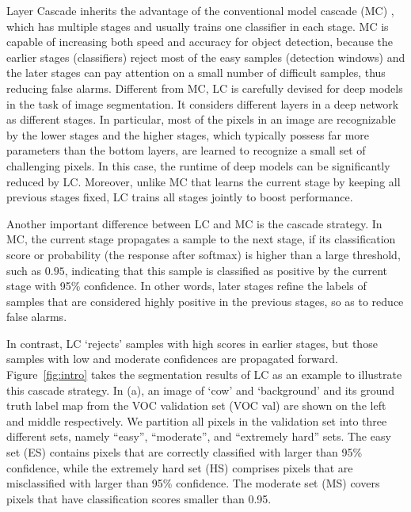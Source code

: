 \documentclass[10pt,twocolumn,letterpaper]{article}
\begin{document}
Layer Cascade inherits the advantage of the conventional model cascade (MC) \cite{li2015convolutional, viola2001rapid}, which has multiple stages and usually trains one classifier in each stage.
MC is capable of increasing both speed and accuracy for object detection, because
the earlier stages (classifiers) reject most of the easy samples (detection windows) and the later stages can pay attention on a small number of difficult samples, thus reducing false alarms.
Different from MC, LC is carefully devised for deep models in the task of image segmentation.
It considers different layers in a deep network as different stages. In particular, most of the pixels in an image are recognizable by the lower stages and the higher stages, which typically possess far more parameters than the bottom layers, are learned to recognize a small set of challenging pixels.
In this case, the runtime of deep models can be significantly reduced by LC.
Moreover, unlike MC that learns the current stage by keeping all previous stages fixed, LC trains all stages jointly to boost performance.





Another important difference between LC and MC is the cascade strategy.
In MC, the current stage propagates a sample to the next stage, if its classification score or probability (\ie the response after softmax) is higher than a large threshold, such as $0.95$, indicating that this sample is classified as positive by the current stage with 95\% confidence.
In other words, later stages refine the labels of samples that are considered highly positive in the previous stages, so as to reduce false alarms.


In contrast, LC `rejects' samples with high scores in earlier stages, but those samples with low and moderate confidences are propagated forward.
Figure~\ref{fig:intro} takes the segmentation results of LC as an example to illustrate this cascade strategy.
In (a), an image of `cow' and `background' and its ground truth label map from the VOC validation set (VOC val) are shown on the left and middle respectively.
We partition all pixels in the validation set into three different sets, namely ``easy'', ``moderate'', and ``extremely hard'' sets.
The easy set (ES) contains pixels that are correctly classified with larger than 95\% confidence, while the extremely hard set (HS) comprises pixels that are misclassified with larger than 95\% confidence.
The moderate set (MS) covers pixels that have classification scores smaller than 0.95.
\end{document}
